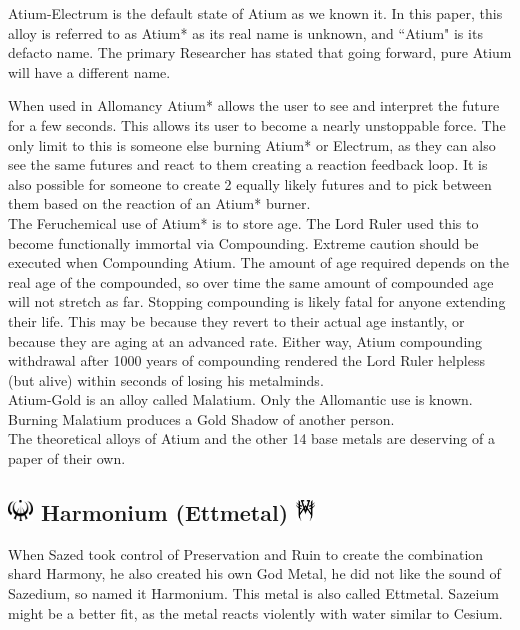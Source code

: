 \documentclass[conference]{IEEEtran}
\begin{document}
Atium-Electrum is the default state of Atium as we known it.\cite{atium-electrum}  In this paper, this alloy is referred to as Atium* as its real name is unknown, and ``Atium" is its defacto name.  The primary Researcher has stated that going forward, pure Atium will have a different name.\cite{Atium-pu-name}

When used in Allomancy Atium* allows the user to see and interpret the future for a few seconds.  This allows its user to become a nearly unstoppable force.\cite{TFE-CH14}  The only limit to this is someone else burning Atium*\cite{TFE-CH13} or Electrum,\cite{HoA-CH3} as they can also see the same futures and react to them creating a reaction feedback loop.  It is also possible for someone to create 2 equally likely futures and to pick between them based on the reaction of an Atium* burner.\cite{WoA-CH47}\\

The Feruchemical use of Atium* is to store age.\cite{WoA-ARS}  The Lord Ruler used this to become functionally immortal via Compounding.\cite{AoL-CH11}  Extreme caution should be executed when Compounding Atium.  The amount of age required depends on the real age of the compounded, so over time the same amount of compounded age will not stretch as far.  Stopping compounding is likely fatal for anyone extending their life.  This may be because they revert to their actual age instantly, or because they are aging at an advanced rate.  Either way, Atium compounding withdrawal after 1000 years of compounding rendered the Lord Ruler helpless (but alive) within seconds of losing his metalminds.\cite{TFE-CH38}\\

Atium-Gold is an alloy called Malatium.\cite{malatium-gold}
Only the Allomantic use is known.  Burning Malatium produces a Gold Shadow of another person.\cite{WoA-ARS}\\

The theoretical alloys of Atium and the other 14 base metals are deserving of a paper of their own.


\subsection*{\includegraphics[height=1em]{images/Ettmetal.png}  Harmonium (Ettmetal) \includegraphics[height=1em]{images/Ettmetal_(Feruchemy).png}}
When Sazed took control of Preservation and Ruin\cite{HoA-CH82} to create the combination shard Harmony,\cite{AoL-CH18} he also created his own God Metal, he did not like the sound of Sazedium,\cite{harmonium-existance} so named it Harmonium.\cite{harmonium-existance}  This metal is also called Ettmetal.\cite{harm-ett} Sazeium might be a better fit, as the metal reacts violently with water\cite{BoM-CH22} similar to Cesium.\cite{super-cesium}\cite{cesium}
\end{document}
